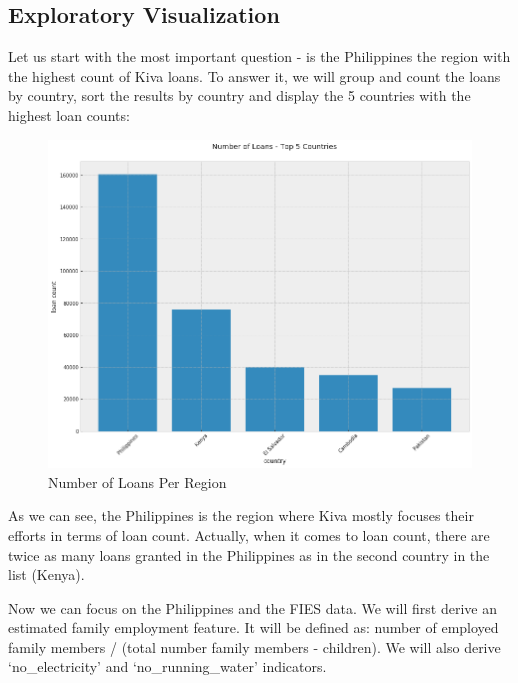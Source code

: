 \documentclass{article}
\begin{document}
\subsection{Exploratory Visualization}
Let us start with the most important question - is the Philippines the region with the highest count of Kiva loans. To answer it, we will group and count the loans by country, sort the results by country and display the 5 countries with the highest loan counts:

\begin{figure}[h]
\caption{Number of Loans Per Region}
\centering
\includegraphics[width = 0.8 \textwidth]{loan_regions}
\end{figure}

As we can see, the Philippines is the region where Kiva mostly focuses their efforts in terms of loan count. Actually, when it comes to loan count, there are twice as many loans granted in the Philippines as in the second country in the list (Kenya).

Now we can focus on the Philippines and the FIES data. We will first derive an estimated family employment feature. It will be defined as: number of employed family members / (total number family members - children). We will also derive ‘no\_electricity’ and ‘no\_running\_water’ indicators.
\end{document}

